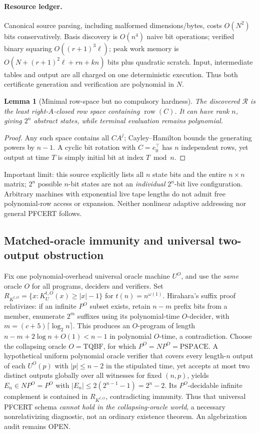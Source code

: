 \documentclass[11pt]{article}
\newtheorem{lemma}{Lemma}
\begin{document}
\paragraph{Resource ledger.} Canonical source parsing, including malformed dimensions/bytes, costs $O(N^2)$ bits conservatively. Basis discovery is $O(n^4)$ naive bit operations; verified binary squaring $O((r+1)^3\ell)$; peak work memory is $O(N+(r+1)^2\ell+rn+kn)$ bits plus quadratic scratch. Input, intermediate tables and output are all charged on one deterministic execution. Thus both certificate generation and verification are polynomial in $N$.
\begin{lemma}[Minimal row-space but no compulsory hardness] The discovered $\mathcal R$ is the least right-$A$-closed row space containing $\operatorname{row}(C)$. It can have rank $n$, giving $2^n$ abstract states, while terminal evaluation remains polynomial. \end{lemma}
\begin{proof} Any such space contains all $CA^j$; Cayley--Hamilton bounds the generating powers by $n-1$. A cyclic bit rotation with $C=e_0^\top$ has $n$ independent rows, yet output at time $T$ is simply initial bit at index $T\bmod n$. \end{proof}
Important limit: this source explicitly lists all $n$ state bits and the entire $n\times n$ matrix; $2^n$ possible $n$-bit states are not an \emph{individual} $2^n$-bit live configuration. Arbitrary machines with exponential live tape lengths do not admit free polynomial-row access or expansion. Neither nonlinear adaptive addressing nor general PFCERT follows.

\subsection{Matched-oracle immunity and universal two-output obstruction}
Fix one polynomial-overhead universal oracle machine $U^O$, and use the \emph{same} oracle $O$ for all programs, deciders and verifiers. Set $R_{K^{t,O}}=\{x:K_U^{t,O}(x)\ge |x|-1\}$ for $t(n)=n^{\omega(1)}$. Hirahara's suffix proof relativizes: if an infinite $P^O$ subset exists, retain $n-m$ prefix bits from a member, enumerate $2^m$ suffixes using its polynomial-time $O$-decider, with $m=(c+5)\lceil\log_2 n\rceil$. This produces an $O$-program of length $n-m+2\log n+O(1)<n-1$ in polynomial $O$-time, a contradiction.
Choose the collapsing oracle $O=\mathrm{TQBF}$, for which $P^O=NP^O=\mathrm{PSPACE}$. A hypothetical uniform polynomial oracle verifier that covers every length-$n$ output of each $U^O(p)$ with $|p|\le n-2$ in the stipulated time, yet accepts at most two distinct outputs globally over all witnesses for fixed $(n,p)$, yields $E_n\in NP^O=P^O$ with $|E_n|\le 2(2^{n-1}-1)=2^n-2$. Its $P^O$-decidable infinite complement is contained in $R_{K^{t,O}}$, contradicting immunity. Thus that universal PFCERT schema \emph{cannot hold in the collapsing-oracle world}, a necessary nonrelativizing diagnostic, not an ordinary existence theorem. An algebrization audit remains OPEN.
\end{document}
